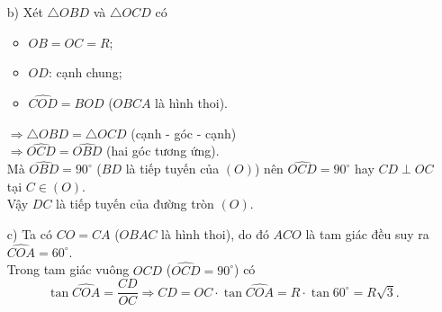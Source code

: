 \begin{bt}
{{		}
	\begin{enumerate}
	\item[b)] Xét $\triangle OBD$ và $\triangle OCD$ có
	\begin{itemize}
		\item $OB=OC=R$;
		\item $OD$: cạnh chung;
		\item $\widehat{COD}=\widehat{BOD}$ ($OBCA$ là hình thoi).
	\end{itemize}
	$\Rightarrow \triangle OBD=\triangle OCD$ (cạnh - góc - cạnh)\\
	$\Rightarrow \widehat{OCD}=\widehat{OBD}$ (hai góc tương ứng).\\
	Mà $\widehat{OBD}=90^\circ$ ($BD$ là tiếp tuyến của $(O)$) nên $\widehat{OCD}=90^\circ$ hay $CD\perp OC$ tại $C\in (O)$.\\
	Vậy $DC$ là tiếp tuyến của đường tròn $(O)$.
	\item[c)] Ta có $CO=CA$ ($OBAC$ là hình thoi), do đó $ACO$ là tam giác đều suy ra $\widehat{COA}=60^\circ$.\\
	Trong tam giác vuông $OCD$ ($\widehat{OCD}=90^\circ$) có
	\[\tan \widehat{COA}=\dfrac{CD}{OC}\Rightarrow CD=OC\cdot \tan \widehat{COA}=R\cdot \tan 60^\circ=R\sqrt{3}.\]
\end{enumerate}	
	}
\end{bt}

